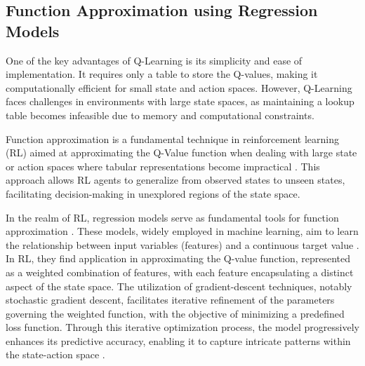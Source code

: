 

\subsection{Function Approximation using Regression Models}

One of the key advantages of Q-Learning is its simplicity and ease of implementation. It requires only a table to store the Q-values, making it computationally efficient for small state and action spaces. However, Q-Learning faces challenges in environments with large state spaces, as maintaining a lookup table becomes infeasible due to memory and computational constraints.

Function approximation is a fundamental technique in reinforcement learning (RL) aimed at approximating the Q-Value function when dealing with large state or action spaces where tabular representations become impractical \cite{russel2020ai}. This approach allows RL agents to generalize from observed states to unseen states, facilitating decision-making in unexplored regions of the state space.

In the realm of RL, regression models serve as fundamental tools for function approximation \cite{sutton2018reinforcement}. These models, widely employed in machine learning, aim to learn the relationship between input variables (features) and a continuous target value \cite{russel2020ai}. In RL, they find application in approximating the Q-value function, represented as a weighted combination of features, with each feature encapsulating a distinct aspect of the state space. The utilization of gradient-descent techniques, notably stochastic gradient descent, facilitates iterative refinement of the parameters governing the weighted function, with the objective of minimizing a predefined loss function. Through this iterative optimization process, the model progressively enhances its predictive accuracy, enabling it to capture intricate patterns within the state-action space \cite{sutton2018reinforcement}.

